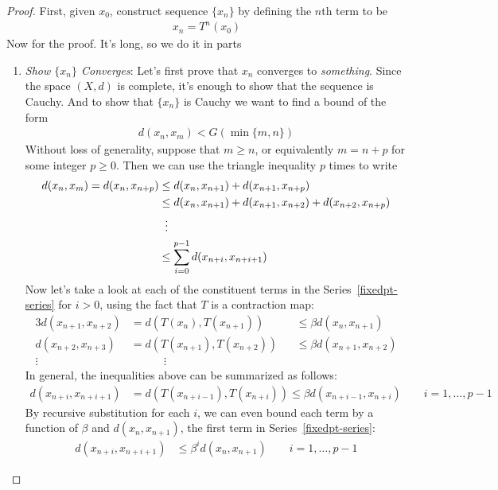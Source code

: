 \documentclass[12pt]{article}
\numberwithin{equation}{section} %
\theoremstyle{plain}
\theoremstyle{definition}
\theoremstyle{remark}
\begin{document}
\begin{proof}
First, given $x_0$, construct sequence $\{x_n\}$ by defining the $n$th
term to be
\begin{align}
  \label{contraction-map-seq}
  x_n = T^n(x_0)
\end{align}
Now for the proof. It's long, so we do it in parts
\begin{enumerate}
\item
\emph{Show $\{x_n\}$ Converges}:
Let's first prove that $x_n$ converges to \emph{something}. Since the
space $(X,d)$ is complete, it's enough to show that the sequence is
Cauchy.  And to show that $\{x_n\}$ is Cauchy we want to find a bound of
the form
\begin{align*}
  d(x_n,x_m) < G(\min\{m,n\})
\end{align*}
Without loss of generality, suppose that $m\geq n$, or equivalently
$m=n+p$ for some integer $p\geq 0$. Then we can use the triangle
inequality $p$ times to write
\begin{align}
  d(x_n,x_m) = d(x_n,x_{n+p})
  &\leq d(x_n,x_{n+1}) + d(x_{n+1},x_{n+p}) \notag \\
  &\leq d(x_n,x_{n+1}) + d(x_{n+1},x_{n+2}) + d(x_{n+2},x_{n+p})\notag\\
  &\;\; \vdots\notag\\
  &\leq \sum^{p-1}_{i=0} d(x_{n+i},x_{n+i+1})
  \label{fixedpt-series}
\end{align}
Now let's take a look at each of the constituent terms in the
Series~\ref{fixedpt-series} for $i>0$, using the fact that $T$ is a
contraction map:
\begin{alignat*}{3}
  d(x_{n+1},x_{n+2}) &=
  d(T(x_{n}),T(x_{n+1}))
  &&\leq
  \beta d(x_{n},x_{n+1}) \\
  d(x_{n+2},x_{n+3}) &=
  d(T(x_{n+1}),T(x_{n+2}))
  &&\leq
  \beta d(x_{n+1},x_{n+2}) \\
  \vdots \quad & \quad\qquad \vdots
\end{alignat*}
In general, the inequalities above can be summarized as follows:
\begin{align*}
  d(x_{n+i},x_{n+i+1}) &=
  d(T(x_{n+i-1}),T(x_{n+i}))
  \leq
  \beta d(x_{n+i-1},x_{n+i})
  \qquad i = 1,\ldots,p-1
\end{align*}
By recursive substitution for each $i$, we can even bound each term by a
function of $\beta$ and $d(x_n,x_{n+1})$, the first term in
Series~\ref{fixedpt-series}:
\begin{align*}
  d(x_{n+i},x_{n+i+1})
  &\leq
  \beta^i d(x_{n},x_{n+1})
  \qquad i = 1,\ldots,p-1

\end{align*}
\end{enumerate}
\end{proof}
\end{document}

